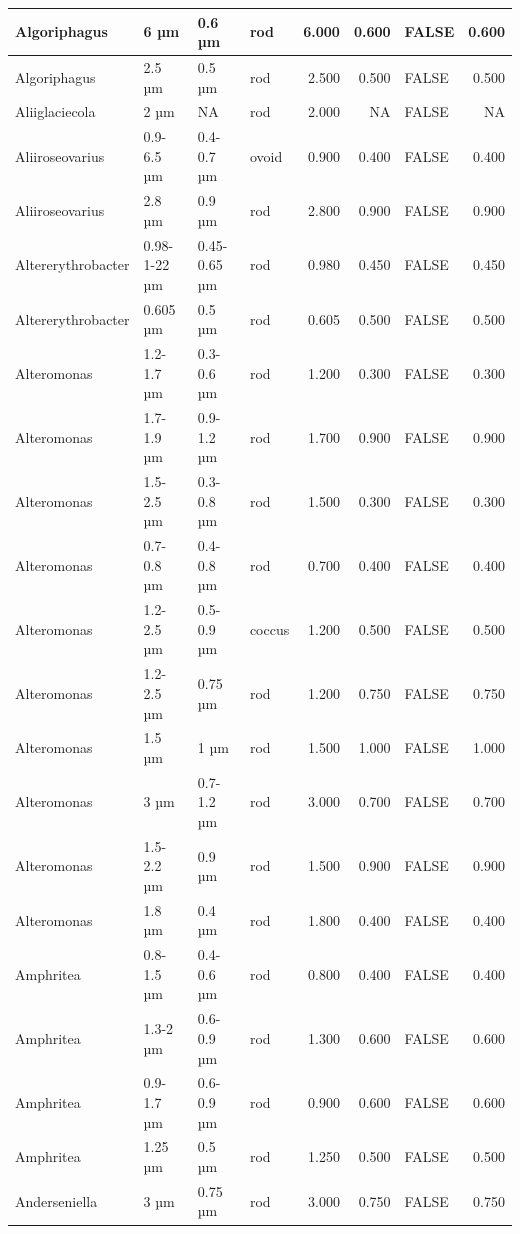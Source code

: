 \documentclass[
]{article}
\begin{document}
\begin{table}
\begin{tabular}{l|l|l|l|r|r|l|r}
\hline
Algoriphagus & 6 µm & 0.6 µm & rod & 6.000 & 0.600 & FALSE & 0.600\\
\hline
Algoriphagus & 2.5 µm & 0.5 µm & rod & 2.500 & 0.500 & FALSE & 0.500\\
\hline
Aliiglaciecola & 2 µm & NA & rod & 2.000 & NA & FALSE & NA\\
\hline
Aliiroseovarius & 0.9-6.5 µm & 0.4-0.7 µm & ovoid & 0.900 & 0.400 & FALSE & 0.400\\
\hline
Aliiroseovarius & 2.8 µm & 0.9 µm & rod & 2.800 & 0.900 & FALSE & 0.900\\
\hline
Altererythrobacter & 0.98-1-22 µm & 0.45-0.65 µm & rod & 0.980 & 0.450 & FALSE & 0.450\\
\hline
Altererythrobacter & 0.605 µm & 0.5 µm & rod & 0.605 & 0.500 & FALSE & 0.500\\
\hline
Alteromonas & 1.2-1.7 µm & 0.3-0.6 µm & rod & 1.200 & 0.300 & FALSE & 0.300\\
\hline
Alteromonas & 1.7-1.9 µm & 0.9-1.2 µm & rod & 1.700 & 0.900 & FALSE & 0.900\\
\hline
Alteromonas & 1.5-2.5 µm & 0.3-0.8 µm & rod & 1.500 & 0.300 & FALSE & 0.300\\
\hline
Alteromonas & 0.7-0.8 µm & 0.4-0.8 µm & rod & 0.700 & 0.400 & FALSE & 0.400\\
\hline
Alteromonas & 1.2-2.5 µm & 0.5-0.9 µm & coccus & 1.200 & 0.500 & FALSE & 0.500\\
\hline
Alteromonas & 1.2-2.5 µm & 0.75 µm & rod & 1.200 & 0.750 & FALSE & 0.750\\
\hline
Alteromonas & 1.5 µm & 1 µm & rod & 1.500 & 1.000 & FALSE & 1.000\\
\hline
Alteromonas & 3 µm & 0.7-1.2 µm & rod & 3.000 & 0.700 & FALSE & 0.700\\
\hline
Alteromonas & 1.5-2.2 µm & 0.9 µm & rod & 1.500 & 0.900 & FALSE & 0.900\\
\hline
Alteromonas & 1.8 µm & 0.4 µm & rod & 1.800 & 0.400 & FALSE & 0.400\\
\hline
Amphritea & 0.8-1.5 µm & 0.4-0.6 µm & rod & 0.800 & 0.400 & FALSE & 0.400\\
\hline
Amphritea & 1.3-2 µm & 0.6-0.9 µm & rod & 1.300 & 0.600 & FALSE & 0.600\\
\hline
Amphritea & 0.9-1.7 µm & 0.6-0.9 µm & rod & 0.900 & 0.600 & FALSE & 0.600\\
\hline
Amphritea & 1.25 µm & 0.5 µm & rod & 1.250 & 0.500 & FALSE & 0.500\\
\hline
Anderseniella & 3 µm & 0.75 µm & rod & 3.000 & 0.750 & FALSE & 0.750\\

\end{tabular}
\end{table}
\end{document}
